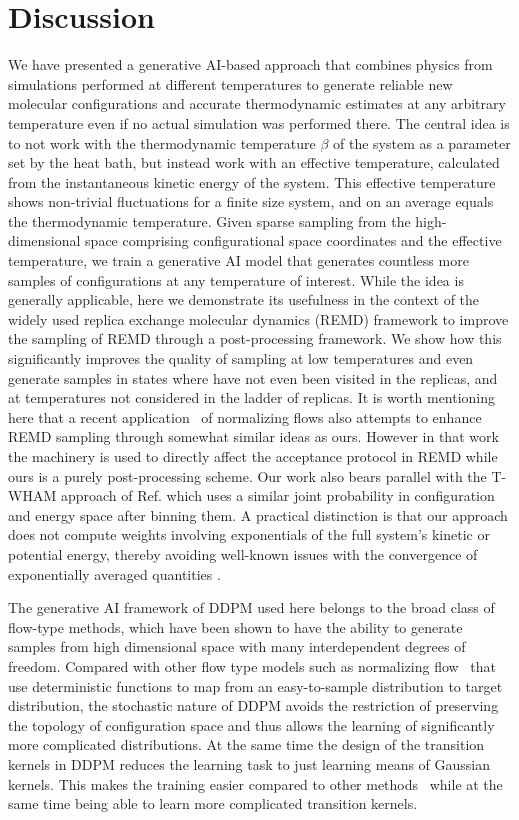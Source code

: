 \section{Discussion}
We have presented a generative AI-based approach that combines physics from simulations performed at different temperatures to generate reliable new molecular configurations and accurate thermodynamic estimates at any arbitrary temperature even if no actual simulation was performed there. The central idea is to not work with the thermodynamic temperature $\beta$ of the system as a parameter set by the heat bath, but instead work with an effective temperature, calculated from the instantaneous kinetic energy of the system. This effective temperature shows non-trivial fluctuations for a finite size system, and on an average equals the thermodynamic temperature. Given sparse sampling from the high-dimensional space comprising configurational space coordinates and the effective temperature, we train a generative AI model that generates countless more samples of configurations at any temperature of interest.  While the idea is generally applicable, here we demonstrate its usefulness in the context of the widely used replica exchange molecular dynamics (REMD) framework to improve the sampling of REMD through a post-processing framework. We show how this significantly improves the quality of sampling at low temperatures and even generate samples in states where have not even been visited in the replicas, and at temperatures not considered in the ladder of replicas.  It is worth mentioning here that a recent application~\cite{dibak2020temperature} of normalizing flows also attempts to enhance REMD sampling through somewhat similar ideas as ours. However in that work the machinery is used to directly affect the acceptance protocol in REMD while ours is a purely post-processing scheme.  Our work also bears parallel with the T-WHAM approach of Ref.  which uses a similar joint probability in configuration and energy space after binning them. A practical distinction is that our approach does not compute weights involving exponentials of the full system's kinetic or potential energy, thereby avoiding well-known issues with the convergence of exponentially averaged quantities \cite{jarzynski2006rare}.

The generative AI framework of DDPM used here belongs to the broad class of flow-type methods, which have been shown to have the ability to generate samples from high dimensional space with many interdependent degrees of freedom. Compared with other flow type models such as normalizing flow~\cite{NF, Noe2019Boltzmann}  that use deterministic functions to map from an easy-to-sample distribution to target distribution, the stochastic nature of DDPM avoids the restriction of preserving the topology of configuration space and thus allows the learning of significantly more complicated distributions. At the same time the design of the transition kernels in DDPM reduces the learning task to just learning means of Gaussian kernels. This makes the training easier compared to other methods~\cite{stochastic_NF} while at the same time being able to learn more complicated transition kernels. 

